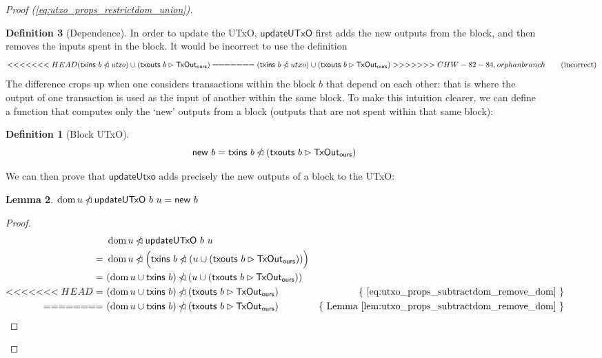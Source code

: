 \documentclass{article}
\newcommand{\restrictdom}{\lhd}
\newcommand{\subtractdom}{\mathbin{\slashed{\restrictdom}}}
\newcommand{\restrictrange}{\rhd}
\DeclareMathOperator{\dom}{dom}
\theoremstyle{definition}{
  \newtheorem{lemma}{Lemma}[section] %
  \newtheorem{definition}[lemma]{Definition}
}
\theoremstyle{theorem}{
  \newtheorem{invariant}[lemma]{Invariant}
  \newtheorem{proofobligation}[lemma]{Proof Obligation}
}
\newtheorem{lemma}{Lemma}[section] %
\newtheorem{definition}[lemma]{Definition}
\numberwithin{equation}{lemma}
\begin{document}
\begin{figure}
\begin{proof}[Proof (\eqref{eq:utxo_props_restrictdom_union})]
\begin{definition}[Dependence]
In order to update the UTxO, $\mathsf{updateUTxO}$ first adds the new outputs
from the block, and then removes the inputs spent in the block. It would be
incorrect to use the definition
%
\begin{equation*}
<<<<<<< HEAD
(\mathsf{txins} ~ b \subtractdom \mathit{utxo})  \cup (\mathsf{txouts} ~ b \restrictrange \mathsf{TxOut_{ours}})
=======
(\mathsf{txins} ~ b \subtractdom utxo)  \cup (\mathsf{txouts} ~ b \restrictrange \mathsf{TxOut_{ours}})
>>>>>>> CHW-82-84, orphan branch
\tag{incorrect}
\end{equation*}
%
The difference crops up when one considers transactions within the block $b$
that depend on each other: that is where the output of one transaction is used
as the input of another within the same block. To make this intuition clearer,
we can define a function that computes only the `new' outputs from a block
(outputs that are not spent within that same block):
%
\begin{definition}[Block UTxO]
\begin{equation*}
\mathsf{new} ~ b = \mathsf{txins} ~ b \subtractdom (\mathsf{txouts} ~ b \restrictrange \mathsf{TxOut_{ours}})
\end{equation*}
\end{definition}
%
We can then prove that $\mathsf{updateUtxo}$ adds precisely the new outputs
of a block to the UTxO:
%
\begin{lemma} \label{lem:update_remove_dom}
\begin{math}
\dom u \subtractdom \mathsf{updateUTxO} ~ b ~ u  = \mathsf{new} ~ b
\end{math}
\end{lemma}
%
\begin{proof}
\begin{align*}
  & ~ \dom u \subtractdom \mathsf{updateUTxO} ~ b ~ u \\
= & ~ \dom u \subtractdom \Bigl( \mathsf{txins} ~ b \subtractdom (u \cup (\mathsf{txouts} ~ b \restrictrange \mathsf{TxOut_{ours}})) \Bigr) \\
= & ~ (\dom u \cup \mathsf{txins} ~ b) \subtractdom (u \cup (\mathsf{txouts} ~ b \restrictrange \mathsf{TxOut_{ours}})) \\
<<<<<<< HEAD
= & ~ (\dom u \cup \mathsf{txins} ~ b) \subtractdom (\mathsf{txouts} ~ b \restrictrange \mathsf{TxOut_{ours}}) & \text{\{ \eqref{eq:utxo_props_subtractdom_remove_dom} \}} \\
=======
= & ~ (\dom u \cup \mathsf{txins} ~ b) \subtractdom (\mathsf{txouts} ~ b \restrictrange \mathsf{TxOut_{ours}}) & \text{\{ Lemma~\ref{lem:utxo_props_subtractdom_remove_dom} \}} \\

\end{align*}
\end{proof}
\end{definition}
\end{proof}
\end{figure}
\end{document}
